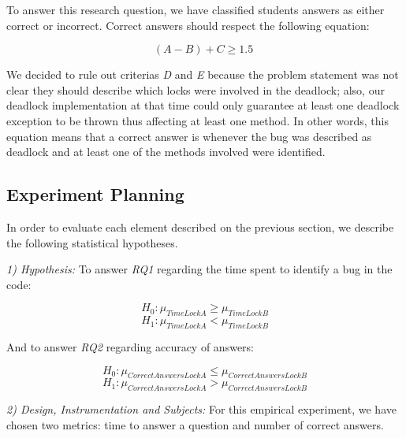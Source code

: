 To answer this research question, we have classified students answers as either correct or incorrect. Correct answers should respect the following equation:

\begin{equation}
  (A - B) + C \geq 1.5 \;
\end{equation}

We decided to rule out criterias \emph{D} and \emph{E} because the problem statement was not clear they should describe which locks were involved in the deadlock; also, our deadlock implementation at that time could only guarantee at least one deadlock exception to be thrown thus affecting at least one method. In other words, this equation means that a correct answer is whenever the bug was described as deadlock and at least one of the methods involved were identified.

\subsection{Experiment Planning}

In order to evaluate each element described on the previous section, we describe the following statistical hypotheses.

\emph{1) Hypothesis:} To answer \emph{RQ1} regarding the time spent to identify a bug in the code:

\begin{equation}
  H_{0} : \mu_{TimeLockA} \geq \mu_{TimeLockB}
\end{equation}
\begin{equation}
  H_{1} : \mu_{TimeLockA} < \mu_{TimeLockB}
\end{equation}

And to answer \emph{RQ2} regarding accuracy of answers:

\begin{equation}
  H_{0} : \mu_{CorrectAnswersLockA} \leq \mu_{CorrectAnswersLockB}
\end{equation}
\begin{equation}
  H_{1} : \mu_{CorrectAnswersLockA} > \mu_{CorrectAnswersLockB}
\end{equation}

\emph{2) Design, Instrumentation and Subjects:} For this empirical experiment, we have chosen two metrics: time to answer a question and number of correct answers.

